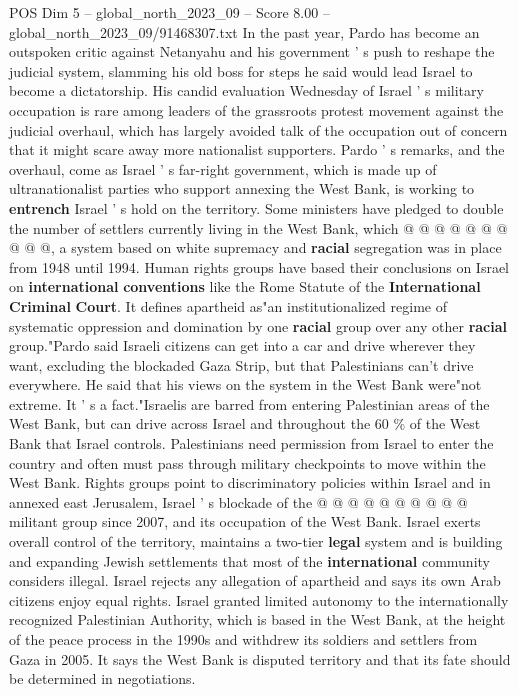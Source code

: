 \begin{textsample}{POS Dim 5 – global\_north\_2023\_09 – Score 8.00 – global\_north\_2023\_09/91468307.txt}
In the past year, Pardo has become an outspoken critic against Netanyahu and his government ' s push to reshape the judicial system, slamming his old boss for steps he said would lead Israel to become a dictatorship.
His candid evaluation Wednesday of Israel ' s military occupation is rare among leaders of the grassroots protest movement against the judicial overhaul, which has largely avoided talk of the occupation out of concern that it might scare away more nationalist supporters.
Pardo ' s remarks, and the overhaul, come as Israel ' s far-right government, which is made up of ultranationalist parties who support annexing the West Bank, is working to \textbf{entrench} Israel ' s hold on the territory.
Some ministers have pledged to double the number of settlers currently living in the West Bank, which @ @ @ @ @ @ @ @ @ @, a system based on white supremacy and \textbf{racial} segregation was in place from 1948 until 1994.
Human rights groups have based their conclusions on Israel on \textbf{international} \textbf{conventions} like the Rome Statute of the \textbf{International} \textbf{Criminal} \textbf{Court}.
It defines apartheid as"an institutionalized regime of systematic oppression and domination by one \textbf{racial} group over any other \textbf{racial} group."Pardo said Israeli citizens can get into a car and drive wherever they want, excluding the blockaded Gaza Strip, but that Palestinians can't drive everywhere.
He said that his views on the system in the West Bank were"not extreme.
It ' s a fact."Israelis are barred from entering Palestinian areas of the West Bank, but can drive across Israel and throughout the 60 \% of the West Bank that Israel controls.
Palestinians need permission from Israel to enter the country and often must pass through military checkpoints to move within the West Bank.
Rights groups point to discriminatory policies within Israel and in annexed east Jerusalem, Israel ' s blockade of the @ @ @ @ @ @ @ @ @ @ militant group since 2007, and its occupation of the West Bank.
Israel exerts overall control of the territory, maintains a two-tier \textbf{legal} system and is building and expanding Jewish settlements that most of the \textbf{international} community considers illegal.
Israel rejects any allegation of apartheid and says its own Arab citizens enjoy equal rights.
Israel granted limited autonomy to the internationally recognized Palestinian Authority, which is based in the West Bank, at the height of the peace process in the 1990s and withdrew its soldiers and settlers from Gaza in 2005.
It says the West Bank is disputed territory and that its fate should be determined in negotiations.

\end{textsample}
